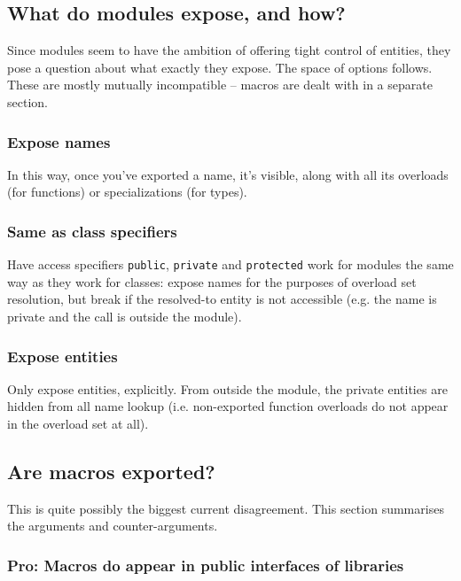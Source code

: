 \documentclass[reqno]{article}
\begin{document}
\subsection{What do modules expose, and how?}

Since modules seem to have the ambition of offering tight control of entities,
they pose a question about what exactly they expose. The space of options
follows. These are mostly mutually incompatible -- macros are dealt with in a
separate section.


\subsubsection{Expose names}

In this way, once you've exported a name, it's visible, along with all its
overloads (for functions) or specializations (for types).


\subsubsection{Same as class specifiers}

Have access specifiers \texttt{public}, \texttt{private} and \texttt{protected}
work for modules the same way as they work for classes: expose names for the
purposes of overload set resolution, but break if the resolved-to entity is
not accessible (e.g. the name is private and the call is outside the module).


\subsubsection{Expose entities}

Only expose entities, explicitly. From outside the module, the private entities
are hidden from all name lookup (i.e. non-exported function overloads do not
appear in the overload set at all).


\subsection{Are macros exported?}

This is quite possibly the biggest current disagreement. This section summarises
the arguments and counter-arguments.


\subsubsection{Pro: Macros do appear in public interfaces of libraries}
\end{document}
